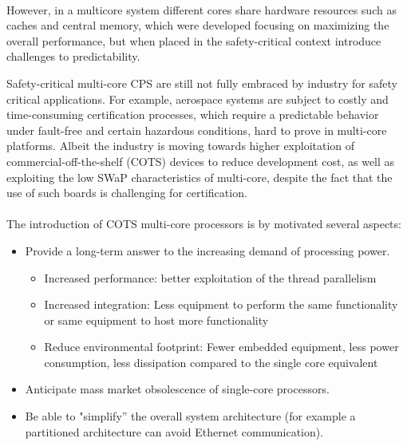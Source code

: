 \paragraph{} However, in a multicore system different cores share hardware resources such as caches and central memory, which were developed focusing on maximizing the overall performance, but when placed in the safety-critical context introduce challenges to predictability.
\par Safety-critical multi-core CPS are still not fully embraced by industry for safety critical applications. For example, aerospace systems are subject to costly and time-consuming certification processes, which require a predictable behavior under fault-free and certain hazardous conditions, hard to prove in multi-core platforms. Albeit the industry is moving towards higher exploitation of commercial-off-the-shelf (COTS) devices to reduce development cost\cite{mulcors}, as well as exploiting the low SWaP characteristics of multi-core, despite the fact that the use of such boards is challenging for certification.

\paragraph{} The introduction of COTS multi-core processors is by motivated several aspects:
\begin{itemize}
\item Provide a long-term answer to the increasing demand of processing power.
\begin{itemize}
\item Increased performance: better exploitation of the thread parallelism
\item Increased integration: Less equipment to perform the same functionality or same equipment to
host more functionality
\item Reduce environmental footprint: Fewer embedded equipment, less power consumption, less dissipation compared to
the single core equivalent
\end{itemize}
\item Anticipate mass market obsolescence of single-core processors.
\item Be able to "simplify” the overall system architecture (for example a partitioned architecture can avoid Ethernet communication).
\end{itemize}

